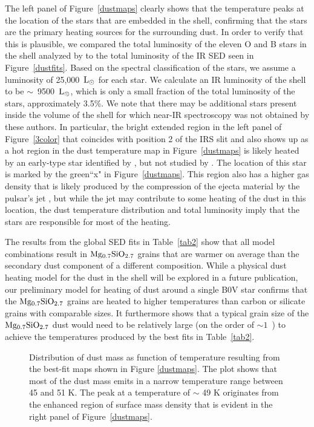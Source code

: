 \documentclass{emulateapj}
\begin{document}
The left panel of Figure~\ref{dustmaps} clearly shows that the temperature peaks at the location of the stars that are embedded in the shell, confirming that the stars are the primary heating sources for the surrounding dust. In order to verify that this is plausible, we compared the total luminosity of the eleven O and B stars in the shell analyzed by \citet{kim13} to the total luminosity of the IR SED seen in Figure~\ref{dustfits}. Based on the spectral classification of the stars, we assume a luminosity of 25,000~$\rm L_{\odot}$ for each star. We calculate an IR luminosity of the shell to be $\sim$~9500~$\rm L_{\odot}$, which is only a small fraction of the total luminosity of the stars, approximately 3.5\%. We note that there may be additional stars present inside the volume of the shell for which near-IR spectroscopy was not obtained by these authors. In particular, the bright extended region in the left panel of Figure~\ref{3color} that coincides with position 2 of the IRS slit and also shows up as a hot region in the dust temperature map in Figure~\ref{dustmaps} is likely heated by an early-type star identified by \citet{morris10}, but not studied by \citet{kim13}. The location of this star is marked by the green``x" in Figure~\ref{dustmaps}. This region also has a higher gas density that is likely produced by the compression of the ejecta material by the pulsar's jet \citep{temim10}, but while the jet may contribute to some heating of the dust in this location, the dust temperature distribution and total luminosity imply that the stars are responsible for most of the heating.

The results from the global SED fits in Table~\ref{tab2} show that all model combinations result in $\rm Mg_{0.7}SiO_{2.7}$ grains that are warmer on average than the secondary dust component of a different composition. While a physical dust heating model for the dust in the shell will be explored in a future publication, our preliminary model for heating of dust around a single B0V star \citep[see][]{temim10} confirms that the $\rm Mg_{0.7}SiO_{2.7}$ grains are heated to higher temperatures than carbon or silicate grains with comparable sizes. It furthermore shows that a typical grain size of the $\rm Mg_{0.7}SiO_{2.7}$ dust would need to be relatively large (on the order of $\sim1$~\micron) to achieve the temperatures produced by the best fits in Table~\ref{tab2}.


\begin{figure}
\center
{} 
\caption{\label{dustplot}Distribution of dust mass as function of temperature resulting from the best-fit maps shown in Figure \ref{dustmaps}. The plot shows that most of the dust mass emits in a narrow temperature range between 45 and 51 K. The peak at a temperature of $\sim$ 49 K originates from the enhanced region of surface mass density that is evident in the right panel of Figure~\ref{dustmaps}.}
\end{figure}
\end{document}
